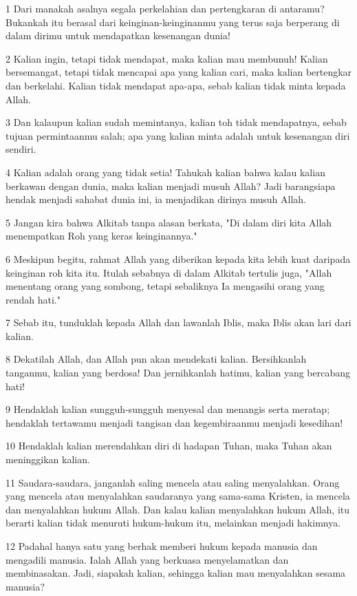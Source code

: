 \par 1 Dari manakah asalnya segala perkelahian dan pertengkaran di antaramu? Bukankah itu berasal dari keinginan-keinginanmu yang terus saja berperang di dalam dirimu untuk mendapatkan kesenangan dunia!
\par 2 Kalian ingin, tetapi tidak mendapat, maka kalian mau membunuh! Kalian bersemangat, tetapi tidak mencapai apa yang kalian cari, maka kalian bertengkar dan berkelahi. Kalian tidak mendapat apa-apa, sebab kalian tidak minta kepada Allah.
\par 3 Dan kalaupun kalian sudah memintanya, kalian toh tidak mendapatnya, sebab tujuan permintaanmu salah; apa yang kalian minta adalah untuk kesenangan diri sendiri.
\par 4 Kalian adalah orang yang tidak setia! Tahukah kalian bahwa kalau kalian berkawan dengan dunia, maka kalian menjadi musuh Allah? Jadi barangsiapa hendak menjadi sahabat dunia ini, ia menjadikan dirinya musuh Allah.
\par 5 Jangan kira bahwa Alkitab tanpa alasan berkata, "Di dalam diri kita Allah menempatkan Roh yang keras keinginannya."
\par 6 Meskipun begitu, rahmat Allah yang diberikan kepada kita lebih kuat daripada keinginan roh kita itu. Itulah sebabnya di dalam Alkitab tertulis juga, "Allah menentang orang yang sombong, tetapi sebaliknya Ia mengasihi orang yang rendah hati."
\par 7 Sebab itu, tunduklah kepada Allah dan lawanlah Iblis, maka Iblis akan lari dari kalian.
\par 8 Dekatilah Allah, dan Allah pun akan mendekati kalian. Bersihkanlah tanganmu, kalian yang berdosa! Dan jernihkanlah hatimu, kalian yang bercabang hati!
\par 9 Hendaklah kalian sungguh-sungguh menyesal dan menangis serta meratap; hendaklah tertawamu menjadi tangisan dan kegembiraanmu menjadi kesedihan!
\par 10 Hendaklah kalian merendahkan diri di hadapan Tuhan, maka Tuhan akan meninggikan kalian.
\par 11 Saudara-saudara, janganlah saling mencela atau saling menyalahkan. Orang yang mencela atau menyalahkan saudaranya yang sama-sama Kristen, ia mencela dan menyalahkan hukum Allah. Dan kalau kalian menyalahkan hukum Allah, itu berarti kalian tidak menuruti hukum-hukum itu, melainkan menjadi hakimnya.
\par 12 Padahal hanya satu yang berhak memberi hukum kepada manusia dan mengadili manusia. Ialah Allah yang berkuasa menyelamatkan dan membinasakan. Jadi, siapakah kalian, sehingga kalian mau menyalahkan sesama manusia?
